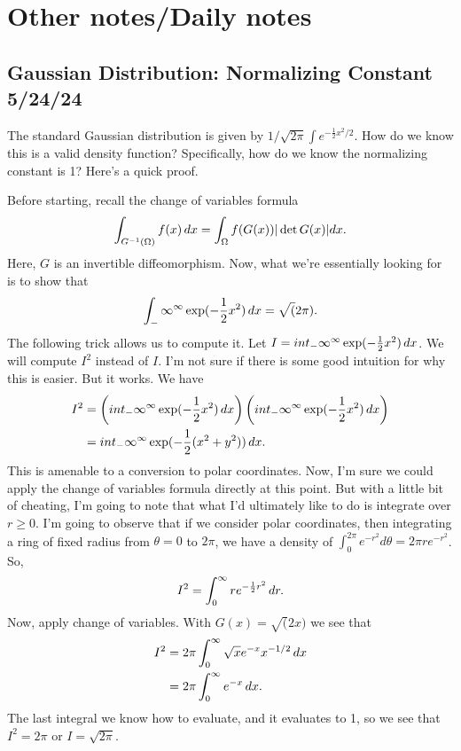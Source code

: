 \chapter{Other notes/Daily notes}
\section{Gaussian Distribution: Normalizing Constant 5/24/24}
The standard Gaussian distribution is given by $1/\sqrt{2\pi}\int e^{-\frac{1}{2}x^2/2}$. How do we know this is a valid density function? Specifically, how do we know the normalizing constant is 1? Here's a quick proof. 

Before starting, recall the change of variables formula
$$
\int_{G^{-1}(\Omega)} f(x)\, dx = \int_\Omega f(G(x))|\det G(x)|dx.
$$
Here, $G$ is an invertible diffeomorphism. Now, what we're essentially looking for is to show that
$$
\int_-\infty^\infty \exp(-\frac{1}{2}x^2)\, dx = \sqrt(2\pi). 
$$
The following trick allows us to compute it. Let $I = int_-\infty^\infty \exp(-\frac{1}{2}x^2)\, dx$. We will compute $I^2$ instead of $I$. I'm not sure if there is some good intuition for why this is easier. But it works. We have
\begin{align}
I^2 & = \left( int_-\infty^\infty \exp(-\frac{1}{2}x^2)\, dx \right)\left( int_-\infty^\infty \exp(-\frac{1}{2}x^2)\, dx \right)\\
& = int_-\infty^\infty \exp(-\frac{1}{2}(x^2+ y^2))\, dx.
\end{align}
This is amenable to a conversion to polar coordinates. Now, I'm sure we could apply the change of variables formula directly at this point. But with a little bit of cheating, I'm going to note that what I'd ultimately like to do is integrate over $r\geq 0$. I'm going to observe that if we consider polar coordinates, then integrating a ring of fixed radius from $\theta=0$ to $2\pi$, we have a density of $\int_0^{2\pi} e^{-r^2} d\theta = 2\pi r e^{-r^2}$. So, 
$$
I^2 = \int_{0}^\infty r e^{-\frac{1}{2}r^2}\, dr.
$$
Now, apply change of variables. With $G(x) = \sqrt(2x)$ we see that
\begin{align}
I^2 & = 2\pi\int_{0}^\infty \sqrt{x} e^{-x} x^{-1/2} \, dx\\
& = 2\pi \int_0^\infty e^{-x}\, dx.
\end{align}
The last integral we know how to evaluate, and it evaluates to 1, so we see that $I^2 = 2\pi$ or $I = \sqrt{2\pi}$. 

